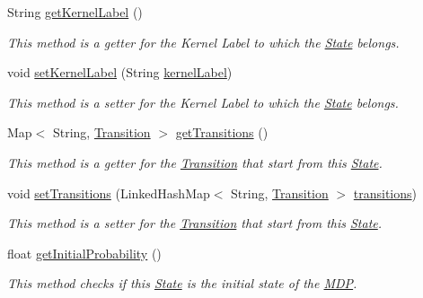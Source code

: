 \begin{DoxyCompactItemize}
String \hyperlink{classmdp_1_1core_1_1_state_a4711a7ffeeede0edcf72550c1eee52e2}{get\+Kernel\+Label} ()
\begin{DoxyCompactList}\small\item\em This method is a getter for the Kernel Label to which the \hyperlink{classmdp_1_1core_1_1_state}{State} belongs. \end{DoxyCompactList}\item 
void \hyperlink{classmdp_1_1core_1_1_state_ab89e4fdb360297c41b3f5ca27a1978fc}{set\+Kernel\+Label} (String \hyperlink{classmdp_1_1core_1_1_state_ac7ca184df7a0ec4141766692290c18ab}{kernel\+Label})
\begin{DoxyCompactList}\small\item\em This method is a setter for the Kernel Label to which the \hyperlink{classmdp_1_1core_1_1_state}{State} belongs. \end{DoxyCompactList}\item 
Map$<$ String, \hyperlink{classmdp_1_1core_1_1_transition}{Transition} $>$ \hyperlink{classmdp_1_1core_1_1_state_ac681391ac0108f110904ed170911b3e1}{get\+Transitions} ()
\begin{DoxyCompactList}\small\item\em This method is a getter for the \hyperlink{classmdp_1_1core_1_1_transition}{Transition} that start from this \hyperlink{classmdp_1_1core_1_1_state}{State}. \end{DoxyCompactList}\item 
void \hyperlink{classmdp_1_1core_1_1_state_af9bbbf26a131aa1f43d7fdf7003b5de1}{set\+Transitions} (Linked\+Hash\+Map$<$ String, \hyperlink{classmdp_1_1core_1_1_transition}{Transition} $>$ \hyperlink{classmdp_1_1core_1_1_state_a3c9b563199f7e235fe083b0d16da8cf3}{transitions})
\begin{DoxyCompactList}\small\item\em This method is a setter for the \hyperlink{classmdp_1_1core_1_1_transition}{Transition} that start from this \hyperlink{classmdp_1_1core_1_1_state}{State}. \end{DoxyCompactList}\item 
float \hyperlink{classmdp_1_1core_1_1_state_adf2467261abc6074a16c27c339a24e8b}{get\+Initial\+Probability} ()
\begin{DoxyCompactList}\small\item\em This method checks if this \hyperlink{classmdp_1_1core_1_1_state}{State} is the initial state of the \hyperlink{classmdp_1_1core_1_1_m_d_p}{M\+D\+P}. \end{DoxyCompactList}\item 

\end{DoxyCompactItemize}
